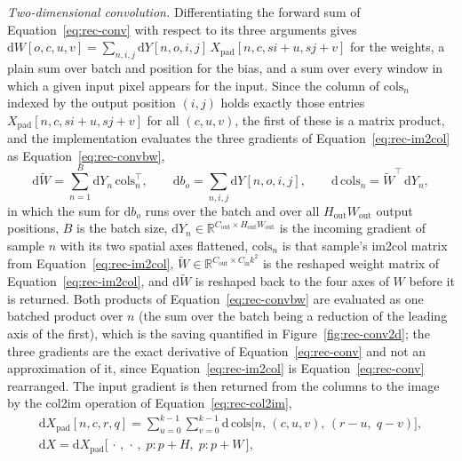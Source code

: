 \emph{Two-dimensional convolution.} Differentiating the forward sum of Equation~\ref{eq:rec-conv} with respect to its three arguments gives
$\mathrm dW[o,c,u,v]=\sum_{n,i,j}\mathrm dY[n,o,i,j]\,X_{\mathrm{pad}}[n,c,si+u,sj+v]$ for the weights,
a plain sum over batch and position for the bias, and a sum over every window in which a given input pixel appears for the input.
Since the column of $\mathrm{cols}_n$ indexed by the output position $(i,j)$ holds exactly those entries $X_{\mathrm{pad}}[n,c,si+u,sj+v]$ for all $(c,u,v)$, the first of these is a matrix product, and the implementation evaluates the three gradients of Equation~\ref{eq:rec-im2col} as Equation~\ref{eq:rec-convbw},
\begin{equation}
\mathrm d\tilde W=\sum_{n=1}^{B}\mathrm dY_n\,\mathrm{cols}_n^{\top},\qquad
\mathrm db_o=\sum_{n,i,j}\mathrm dY[n,o,i,j],\qquad
\mathrm d\,\mathrm{cols}_n=\tilde W^{\top}\,\mathrm dY_n,
\label{eq:rec-convbw}
\end{equation}
in which the sum for $\mathrm db_o$ runs over the batch and over all $H_{\mathrm{out}}W_{\mathrm{out}}$ output positions, $B$ is the batch size, $\mathrm dY_n\in\mathbb R^{C_{\mathrm{out}}\times H_{\mathrm{out}}W_{\mathrm{out}}}$ is the incoming gradient of sample $n$ with its two spatial axes flattened, $\mathrm{cols}_n$ is that sample's im2col matrix from Equation~\ref{eq:rec-im2col}, $\tilde W\in\mathbb R^{C_{\mathrm{out}}\times C_{\mathrm{in}}k^2}$ is the reshaped weight matrix of Equation~\ref{eq:rec-im2col}, and $\mathrm d\tilde W$ is reshaped back to the four axes of $W$ before it is returned.
Both products of Equation~\ref{eq:rec-convbw} are evaluated as one batched product over $n$ (the sum over the batch being a reduction of the leading axis of the first), which is the saving quantified in Figure~\ref{fig:rec-conv2d}; the three gradients are the exact derivative of Equation~\ref{eq:rec-conv} and not an approximation of it, since Equation~\ref{eq:rec-im2col} is Equation~\ref{eq:rec-conv} rearranged.
The input gradient is then returned from the columns to the image by the col2im operation of Equation~\ref{eq:rec-col2im},
\begin{equation}
\begin{gathered}
\mathrm dX_{\mathrm{pad}}[n,c,r,q]=\sum_{u=0}^{k-1}\sum_{v=0}^{k-1}\mathrm d\,\mathrm{cols}\bigl[n,\,(c,u,v),\,(r-u,\;q-v)\bigr],\\
\mathrm dX=\mathrm dX_{\mathrm{pad}}\bigl[\,\cdot\,,\,\cdot\,,\;p{:}p{+}H,\;p{:}p{+}W\,\bigr],
\end{gathered}
\label{eq:rec-col2im}
\end{equation}
